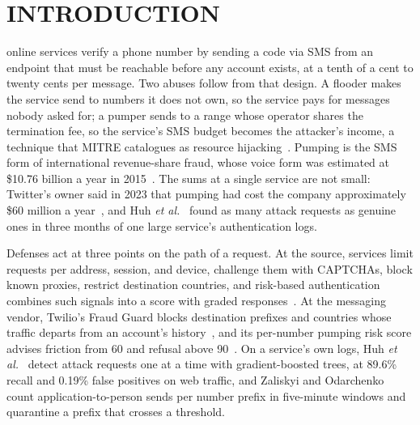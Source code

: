 \documentclass{IEEEoj}
\begin{document}
\maketitle


\section{INTRODUCTION}
\label{sec:intro}

 online services verify a phone number by sending a code via SMS from an endpoint that must be reachable before any account exists, at a tenth of a cent to twenty cents per message. Two abuses follow from that design. A flooder makes the service send to numbers it does not own, so the service pays for messages nobody asked for; a pumper sends to a range whose operator shares the termination fee, so the service's SMS budget becomes the attacker's income, a technique that MITRE catalogues as resource hijacking~\cite{mitre_t1496_003}. Pumping is the SMS form of international revenue-share fraud, whose voice form was estimated at \$10.76 billion a year in 2015~\cite{sahin2017sok}. The sums at a single service are not small: Twitter's owner said in 2023 that pumping had cost the company approximately \$60 million a year~\cite{commsrisk2023twitter}, and Huh \textit{et al.}~\cite{huh2025ait} found as many attack requests as genuine ones in three months of one large service's authentication logs.

Defenses act at three points on the path of a request. At the source, services limit requests per address, session, and device, challenge them with CAPTCHAs, block known proxies, restrict destination countries, and risk-based authentication combines such signals into a score with graded responses~\cite{wiefling2019rba}. At the messaging vendor, Twilio's Fraud Guard blocks destination prefixes and countries whose traffic departs from an account's history~\cite{twilio_fraudguard}, and its per-number pumping risk score advises friction from 60 and refusal above 90~\cite{twilio_pumping_risk}. On a service's own logs, Huh \textit{et al.}~\cite{huh2025ait} detect attack requests one at a time with gradient-boosted trees, at 89.6\% recall and 0.19\% false positives on web traffic, and Zaliskyi and Odarchenko~\cite{zaliskyi2026ait} count application-to-person sends per number prefix in five-minute windows and quarantine a prefix that crosses a threshold.
\end{document}
